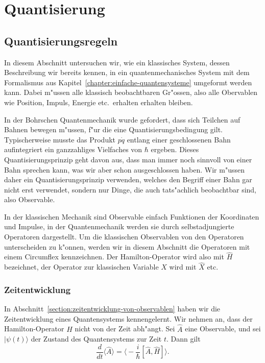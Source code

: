 \chapter{Quantisierung\label{chapter:quantisierung}}
\rhead{}

\section{Quantisierungsregeln}
In diesem Abschnitt untersuchen wir, wie ein klassisches System, dessen
Beschreibung wir bereits kennen, in ein quantenmechanisches System 
mit dem Formalismus aus Kapitel~\ref{chapter:einfache-quantensysteme}
umgeformt werden kann.
Dabei m"ussen alle klassisch beobachtbaren Gr"ossen, also alle Obervablen
wie Position, Impuls, Energie etc.~erhalten erhalten bleiben.

In der Bohrschen Quantenmechanik wurde gefordert, dass 
sich Teilchen auf Bahnen bewegen m"ussen, f"ur die eine
Quantisierungsbedingung gilt.
Typischerweise musste das Produkt $p\dot q$ entlang einer geschlossenen
Bahn aufintegriert ein ganzzahliges Vielfaches von $\hbar$ ergeben.
Dieses Quantisierungsprinzip geht davon aus, dass man immer noch sinnvoll
von einer Bahn sprechen kann, was wir aber schon ausgeschlossen haben.
Wir m"ussen daher ein Quantisierungsprinzip verwenden, welches den
Begriff einer Bahn gar nicht erst verwendet, sondern nur Dinge, die
auch tats"achlich beobachtbar sind, also Observable.

In der klassischen Mechanik sind Observable einfach Funktionen
der Koordinaten und Impulse,
in der Quantenmechanik werden sie durch selbstadjungierte
Operatoren dargestellt.
Um die klassischen Observablen von den Operatoren unterscheiden zu
k"onnen, werden wir in diesem Abschnitt die Operatoren mit einem
Circumflex kennzeichnen.
Der Hamilton-Operator wird also mit $\hat H$ bezeichnet, 
der Operator zur klassischen Variable $X$ wird mit $\hat X$ etc.

\subsection{Zeitentwicklung}
In Abschnitt~\ref{section:zeitentwicklung-von-observablen} haben wir die
Zeitentwicklung eines Quantensystems kennengelernt.
Wir nehmen an, dass der Hamilton-Operator $H$ nicht von der Zeit abh"angt.
Sei $\hat A$ eine Observable, und sei $|\psi(t)\rangle$ der Zustand des
Quantensystems zur Zeit $t$.
Dann gilt
\[
\frac{d}{dt}\langle \hat A\rangle
=
\biggl\langle -\frac{i}{\hbar}[\hat A,\hat H] \biggr\rangle.
\]

